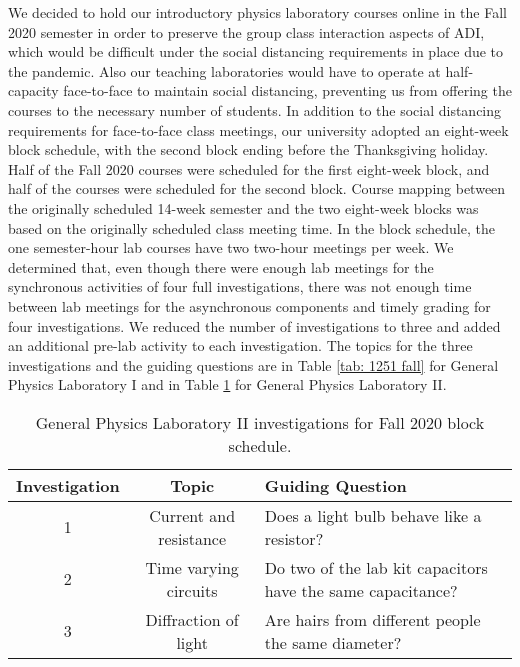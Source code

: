 \documentclass[aip, numerical, preprint]{revtex4-2}
\begin{document}
We decided to hold our introductory physics laboratory courses online in the Fall 2020 semester
in order to preserve the group class interaction aspects of ADI, which would be difficult under
the social distancing requirements in place due to the pandemic.\citep{mclber20} Also our
teaching laboratories would have to operate at half-capacity face-to-face to maintain social distancing,
preventing us from offering the courses to the necessary number of students.  In addition to
the social distancing requirements for face-to-face class meetings, our university adopted an
eight-week block schedule, with the second block ending before the Thanksgiving holiday. Half
of the Fall 2020 courses were scheduled for the first eight-week block, and half of the courses
were scheduled for the second block. Course mapping between the originally scheduled 14-week
semester and the two eight-week blocks was based on the originally scheduled class meeting
time. In the block schedule, the one semester-hour lab courses have two two-hour meetings per
week. We determined that, even though there were enough lab meetings for the synchronous
activities of four full investigations, there was not enough time between lab meetings for the
asynchronous components and timely grading for four investigations. We reduced the number of
investigations to three and added an additional pre-lab activity to each investigation. The
topics for the three investigations and the guiding questions are in Table \ref{tab: 1251 fall}
for General Physics Laboratory I and in Table \ref{tab: 1261 fall} for General Physics
Laboratory II.

\begin{table}
  \caption{\label{tab: 1261 fall} General Physics Laboratory II investigations for Fall 2020
    block schedule.}
  \begin{ruledtabular}
    \begin{tabular}{ccp{26em}}
      Investigation & Topic & Guiding Question\\
      \hline
      1 & Current and resistance & Does a light bulb behave like a resistor? \\
      2 & Time varying circuits & Do two of the lab kit capacitors have the same capacitance? \\
      3 & Diffraction of light & Are hairs from different people the same diameter?
    \end{tabular}
  \end{ruledtabular}
\end{table}
\end{document}
